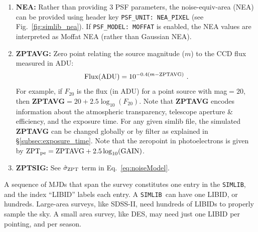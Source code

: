 \documentclass[12pt]{article}
\newcommand{\simlib}{{\tt SIMLIB}}
\newcommand{\sigZPT}{\hat\sigma_{\rm ZPT}}
\newcommand{\ZPTpe}{{\rm ZPT}_{\rm pe}}
\begin{document}
{\begin{enumerate}
	 values in the more astronomy-friendly units of arcsec-FWHM 
	 by specifying the simlib header key
        \vspace{-0.4cm}
	\begin{verbatim} 
           PSF_UNIT:  ARCSEC_FWHM
	\end{verbatim} 
        \vspace{-0.4cm}
	The simulated README file includes the {\tt PSF\_UNIT} value.
	These PSF values are used to determine a noise-equivalent
	area ($A$ in Eq.~\ref{eq:noiseModel} and Eq.~\ref{eq:NEA_formula}). 
		If you have computed $A$ from the measured PSF, 
		then you can simply define 
		${\rm PSF1} = \sqrt{A/4\pi}$ and set {\bf PSF2}={\bf RATIO}=0.
	Alternatively, to simulate more realistic PSF wings, a normalized
	Moffat profile can be enabled with global-header keys
	{\tt PSF\_MODEL: MOFFAT} and {\tt MOFFAT\_BETA: <VAL>}.
	For {\tt PSF\_UNIT: ARCSEC\_FWHM}, {\bf PSF1} is interpreted as the
	Moffat FWHM (and {\bf PSF2},{\bf RATIO} should be zero/ignored).
	For {\tt PSF\_UNIT: NEA\_PIXEL} (or {\tt NEA\_ARCSECSQ}), the NEA value
	is interpreted as the Moffat NEA and SNANA computes the corresponding
	FWHM from ({\tt NEA},{\tt MOFFAT\_BETA}).
%
  \item {\bf NEA:} Rather than providing 3 PSF parameters, the noise-equiv-area
       (NEA) can be provided using header key {\tt PSF\_UNIT: NEA\_PIXEL}
       (see Fig.~\ref{fig:simlib_nea}).
       If {\tt PSF\_MODEL: MOFFAT} is enabled, the NEA values are interpreted
       as Moffat NEA (rather than Gaussian NEA).
%
  \item {\bf ZPTAVG:} Zero point relating the source magnitude ($m$) 
    to the CCD flux measured in ADU: 
       $$ {\rm Flux(ADU)} = 10^{-0.4(m-{\rm ZPTAVG})}~.  $$
    For example, if $F_{20}$ is the flux (in ADU) for a point source
    with mag$=20$, then {\bf ZPTAVG}$= 20 + 2.5\log_{10}(F_{20})$.
    Note that {\bf ZPTAVG} encodes information about the 
    atmospheric transparency, telescope aperture \& efficiency,
    and the exposure time. 
    For any given simlib file, the simulated {\bf ZPTAVG} can be changed
    globally or by filter as explained in \S\ref{subsec:exposure_time}.
    Note that the zeropoint in photoelectrons is given by
    $\ZPTpe = {\rm ZPTAVG} + 2.5\log_{10}({\rm GAIN})$.
%
  \item {\bf ZPTSIG:} See $\sigZPT$ term in Eq.~\ref{eq:noiseModel}.
\end{enumerate}


A sequence of MJDs that span the survey constitutes one entry
in the {\simlib}, and the index ``LIBID'' labels each entry.
A \simlib\ can have one LIBID, or hundreds. Large-area surveys,
like SDSS-II, need hundreds of LIBIDs to properly sample the sky.
A small area survey, like DES, may need just one LIBID per pointing,
and per season.


}
\end{document}
